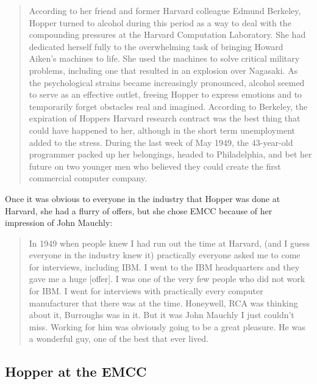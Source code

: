 \begin{quotation}
	According to her friend and former Harvard colleague Edmund
	Berkeley, Hopper turned to alcohol during this period as a way to
	deal with the compounding pressures at the Harvard Computation
	Laboratory. She had dedicated herself fully to the overwhelming task
	of bringing Howard Aiken's machines to life.  She used the machines
	to solve critical military problems, including one that resulted in
	an explosion over Nagasaki. As the psychological strains
	became increasingly pronounced, alcohol seemed to serve as an
	effective outlet, freeing Hopper to express emotions and to
	temporarily forget obstacles real and imagined. According to
	Berkeley, the expiration of Hoppers Harvard research contract was
	the best thing that could have happened to her, although in
	the short term unemployment added to the stress.  During the last
	week of May 1949, the 43-year-old programmer packed up her
	belongings, headed to Philadelphia, and bet her future on two
	younger men who believed they could create the first commercial
	computer company.
	\cite{grace_hopper_and_the_invention_of_the_information_age_2009}
\end{quotation}

Once it was obvious to everyone in the industry that
Hopper was done at Harvard, she had a flurry of offers, but she chose
EMCC because of her impression of John Mauchly:

\begin{quotation}
	In 1949 when people knew I had run out the time at
	Harvard, (and I guess everyone in the industry knew it) practically
	everyone asked me to come for interviews, including IBM. I went to
	the IBM headquarters and they gave me a huge [offer].  I was one of
	the very few people who did not work for IBM. I went for interviews
	with practically every computer manufacturer that there was at the
	time. Honeywell, RCA was thinking about it, Burroughs was in it.
	But it was John Mauchly I just couldn't miss. Working for him was
	obviously going to be a great pleasure. He was a wonderful guy, one
	of the best that ever lived.
	\cite{Hopper_1980_Oral_History}
\end{quotation}

\subsection{Hopper at the EMCC}

